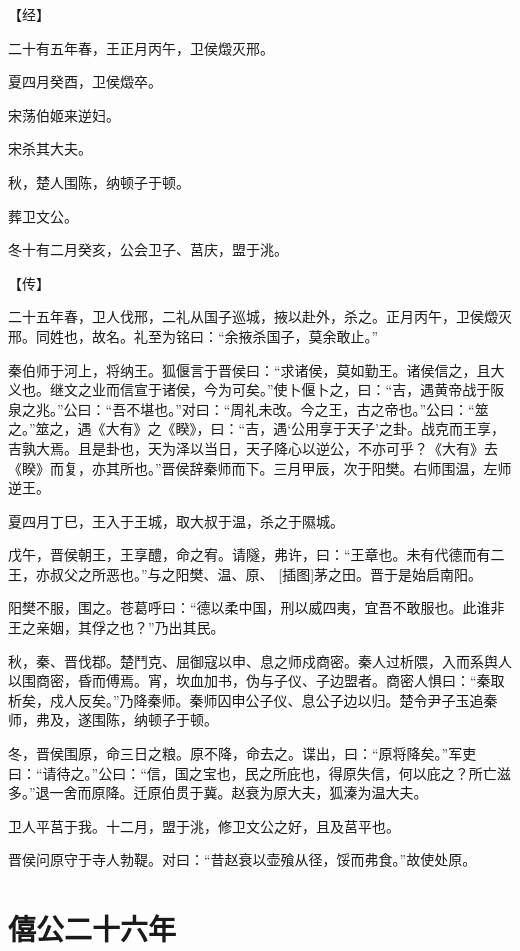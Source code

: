 \documentclass[a4paper,12pt,UTF8,twoside]{ctexbook}
\begin{document}
【经】

二十有五年春，王正月丙午，卫侯燬灭邢。

夏四月癸酉，卫侯燬卒。

宋荡伯姬来逆妇。

宋杀其大夫。

秋，楚人围陈，纳顿子于顿。

葬卫文公。

冬十有二月癸亥，公会卫子、莒庆，盟于洮。

【传】

二十五年春，卫人伐邢，二礼从国子巡城，掖以赴外，杀之。正月丙午，卫侯燬灭邢。同姓也，故名。礼至为铭曰：“余掖杀国子，莫余敢止。”

秦伯师于河上，将纳王。狐偃言于晋侯曰：“求诸侯，莫如勤王。诸侯信之，且大义也。继文之业而信宣于诸侯，今为可矣。”使卜偃卜之，曰：“吉，遇黄帝战于阪泉之兆。”公曰：“吾不堪也。”对曰：“周礼未改。今之王，古之帝也。”公曰：“筮之。”筮之，遇《大有》之《睽》，曰：“吉，遇‘公用享于天子’之卦。战克而王享，吉孰大焉。且是卦也，天为泽以当日，天子降心以逆公，不亦可乎？《大有》去《睽》而复，亦其所也。”晋侯辞秦师而下。三月甲辰，次于阳樊。右师围温，左师逆王。

夏四月丁巳，王入于王城，取大叔于温，杀之于隰城。

戊午，晋侯朝王，王享醴，命之宥。请隧，弗许，曰：“王章也。未有代德而有二王，亦叔父之所恶也。”与之阳樊、温、原、 [插图]茅之田。晋于是始启南阳。

阳樊不服，围之。苍葛呼曰：“德以柔中国，刑以威四夷，宜吾不敢服也。此谁非王之亲姻，其俘之也？”乃出其民。

秋，秦、晋伐鄀。楚鬥克、屈御寇以申、息之师戍商密。秦人过析隈，入而系舆人以围商密，昏而傅焉。宵，坎血加书，伪与子仪、子边盟者。商密人惧曰：“秦取析矣，戍人反矣。”乃降秦师。秦师囚申公子仪、息公子边以归。楚令尹子玉追秦师，弗及，遂围陈，纳顿子于顿。

冬，晋侯围原，命三日之粮。原不降，命去之。谍出，曰：“原将降矣。”军吏曰：“请待之。”公曰：“信，国之宝也，民之所庇也，得原失信，何以庇之？所亡滋多。”退一舍而原降。迁原伯贯于冀。赵衰为原大夫，狐溱为温大夫。

卫人平莒于我。十二月，盟于洮，修卫文公之好，且及莒平也。

晋侯问原守于寺人勃鞮。对曰：“昔赵衰以壶飱从径，馁而弗食。”故使处原。


\section{僖公二十六年}
\end{document}

